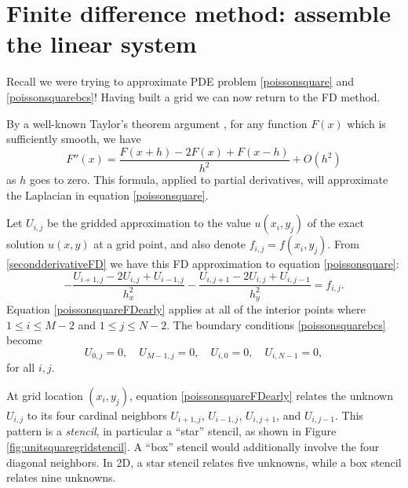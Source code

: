 \section{Finite difference method: assemble the linear system}

Recall we were trying to approximate PDE problem \eqref{poissonsquare} and \eqref{poissonsquarebcs}!  Having built a grid we can now return to the FD method.

By a well-known Taylor's theorem argument \citep{MortonMayers}, for any function $F(x)$ which is sufficiently smooth, we have
\begin{equation}
   F''(x) = \frac{F(x+h) - 2 F(x) + F(x-h)}{h^2} + O(h^2)  \label{secondderivativeFD}
\end{equation}
as $h$ goes to zero.  This formula, applied to partial derivatives, will approximate the Laplacian in equation \eqref{poissonsquare}.

Let $U_{i,j}$ be the gridded approximation to the value $u(x_i,y_j)$ of the exact solution $u(x,y)$ at a grid point, and also denote $f_{i,j} = f(x_i,y_j)$.  From \eqref{secondderivativeFD} we have this FD approximation to equation \eqref{poissonsquare}:
\begin{equation}
- \frac{U_{i+1,j} - 2 U_{i,j} + U_{i-1,j}}{h_x^2} - \frac{U_{i,j+1} - 2 U_{i,j} + U_{i,j-1}}{h_y^2} = f_{i,j}. \label{poissonsquareFDearly}
\end{equation}
Equation \eqref{poissonsquareFDearly} applies at all of the interior points where $1 \le i \le M-2$ and $1 \le j \le N-2$.  The boundary conditions \eqref{poissonsquarebcs} become
\begin{equation}
U_{0,j} = 0, \quad U_{M-1,j} = 0, \quad U_{i,0} = 0, \quad U_{i,N-1} = 0, \label{poissonsquareFDbcs}
\end{equation}
for all $i,j$.

At grid location $(x_i,y_j)$, equation \eqref{poissonsquareFDearly} relates the unknown $U_{i,j}$ to its four cardinal neighbors $U_{i+1,j}$, $U_{i-1,j}$, $U_{i,j+1}$, and $U_{i,j-1}$.  This pattern is a \emph{stencil}, in particular a ``star'' stencil, as shown in Figure \ref{fig:unitsquaregridstencil}.  A ``box'' stencil would additionally involve the four diagonal neighbors.  In 2D, a star stencil relates five unknowns, while a box stencil relates nine unknowns.

